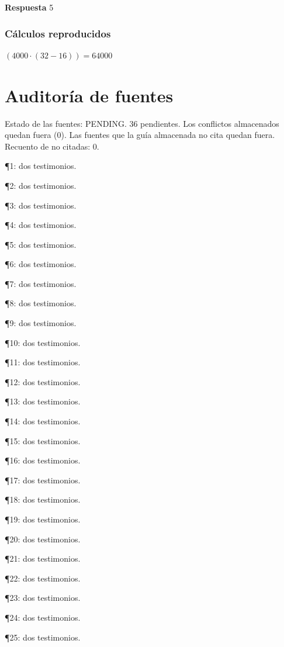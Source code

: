 \documentclass{book}
\begin{document}
\noindent\textbf{Respuesta} 5

\subsection*{Cálculos reproducidos}

\(\left(4000\cdot \left(32-16\right)\right) = 64000\)
\chapter{Auditoría de fuentes}

\noindent Estado de las fuentes: PENDING. 36 pendientes. Los conflictos almacenados quedan fuera (0). Las fuentes que la guía almacenada no cita quedan fuera. Recuento de no citadas: 0.

\noindent ¶1: dos testimonios.

\noindent ¶2: dos testimonios.

\noindent ¶3: dos testimonios.

\noindent ¶4: dos testimonios.

\noindent ¶5: dos testimonios.

\noindent ¶6: dos testimonios.

\noindent ¶7: dos testimonios.

\noindent ¶8: dos testimonios.

\noindent ¶9: dos testimonios.

\noindent ¶10: dos testimonios.

\noindent ¶11: dos testimonios.

\noindent ¶12: dos testimonios.

\noindent ¶13: dos testimonios.

\noindent ¶14: dos testimonios.

\noindent ¶15: dos testimonios.

\noindent ¶16: dos testimonios.

\noindent ¶17: dos testimonios.

\noindent ¶18: dos testimonios.

\noindent ¶19: dos testimonios.

\noindent ¶20: dos testimonios.

\noindent ¶21: dos testimonios.

\noindent ¶22: dos testimonios.

\noindent ¶23: dos testimonios.

\noindent ¶24: dos testimonios.

\noindent ¶25: dos testimonios.
\end{document}
